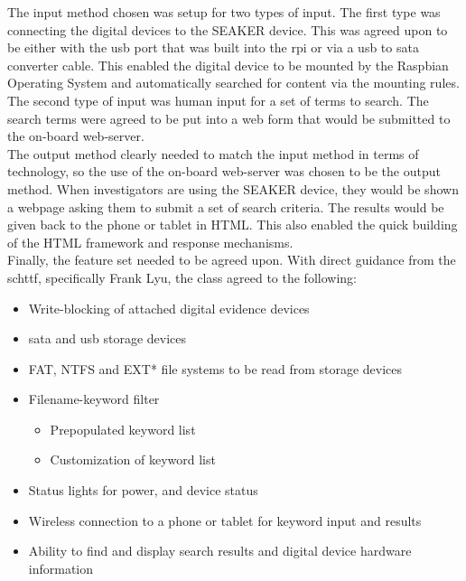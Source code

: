 \documentclass[12pt]{article}
\begin{document}
The input method chosen was setup for two types of input.  The first type was connecting
the digital devices to the SEAKER device.  This was agreed upon to be either with the \gls{usb}
port that was built into the \gls{rpi} or via a \gls{usb} to \gls{sata} converter cable.  This enabled
the digital device to be mounted by the Raspbian Operating System and automatically 
searched for content via the mounting rules.  The second type of input was human input
for a set of terms to search.  The search terms were agreed to be put into a web form that
would be submitted to the on-board web-server.\\

The output method clearly needed to match the input method in terms of technology, so the
use of the on-board web-server was chosen to be the output method.  When investigators are
using the SEAKER device, they would be shown a webpage asking them to submit a 
set of search criteria.  The results would be given back to the phone or tablet in HTML.
This also enabled the quick building of the HTML framework and response mechanisms.\\

Finally, the feature set needed to be agreed upon.  With direct guidance from the \gls{schttf},
specifically Frank Lyu, the class agreed to the following:

\vspace{0.5 cm}
\begin{itemize}
  \item Write-blocking of attached digital evidence devices
  \item \gls{sata} and \gls{usb} storage devices
  \item FAT, NTFS and EXT* file systems to be read from storage devices
  \item Filename-keyword filter
  \begin{itemize}
    \item Prepopulated keyword list
    \item Customization of keyword list
  \end{itemize}
  \item Status lights for power, and device status
  \item Wireless connection to a phone or tablet for keyword input and results
  \item Ability to find and display search results and digital device hardware information
\end{itemize}
\vspace{0.5 cm}
\end{document}
